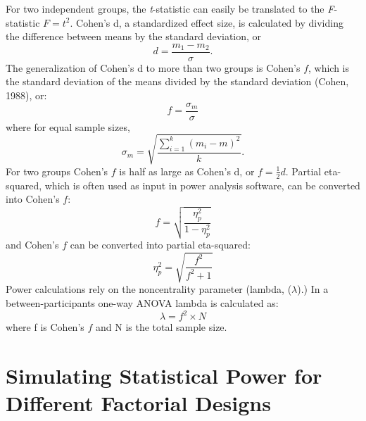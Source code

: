 \documentclass[,man,floatsintext]{apa6}
\begin{document}
\begin{tcolorbox}[colback=black!5!white,colframe=white!5!black,title=Box 1. Formula for effect sizes for ANOVA designs]
For two independent groups, the \textit{t}-statistic can easily be translated to the \textit{F}-statistic $F = t^2$.
Cohen's d, a standardized effect size, is calculated by dividing the difference between means by the standard deviation, or 
\begin{equation}
d = \frac{m_1-m_2}{\sigma}.
\end{equation}
The generalization of Cohen's d to more than two groups is Cohen's $f$, which is the standard deviation of the means divided by the standard deviation (Cohen, 1988), or: 
\begin{equation}
f = \frac{\sigma _{ m }}{\sigma}
\end{equation}
where for equal sample sizes,
\begin{equation}
\sigma _{ m } = \sqrt { \frac { \sum_ { i = 1 } ^ { k } ( m _ { i } - m ) ^ { 2 } } { k } }.
\end{equation}
For two groups Cohen's $f$ is half as large as Cohen's d, or $f = \frac{1}{2}d$.
Partial eta-squared, which is often used as input in power analysis software, can be converted into Cohen's $f$:
\begin{equation}
f = \sqrt{\frac{\eta_p^2}{1-\eta_p^2}} \label{eq:eta-to-f}
\end{equation}
and Cohen's $f$ can be converted into partial eta-squared:
\begin{equation}
\eta_p^2 = \sqrt{\frac{f^2}{f^2+1}} \label{eq:f-to-eta}
\end{equation}
Power calculations rely on the noncentrality parameter (lambda, ($\lambda$).) 
In a between-participants one-way ANOVA lambda is calculated as:
\begin{equation}
\lambda = f^2 \times N \label{eq:lambda}
\end{equation}
where f is Cohen's $f$ and N is the total sample size. 
\end{tcolorbox}

\hypertarget{simulating-statistical-power-for-different-factorial-designs}{%
\section{Simulating Statistical Power for Different Factorial Designs}\label{simulating-statistical-power-for-different-factorial-designs}}
\end{document}
